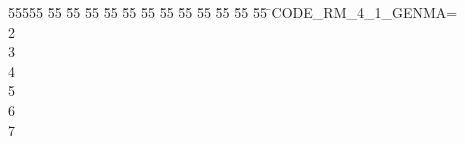 %
%
\begin{tabbing}
55555 \= 55 \= 55 \= 55 \= 55 \= 55 \= 55 \= 55 \= 55 \= 55 \= 55 \= 55 \= 55 \= \>CODE\_RM\_4\_1\_GENMA=\\[0pt]
2\\[0pt]
3\\[0pt]
4\\[0pt]
5\\[0pt]
6\\[0pt]
7\>\end{tabbing}
